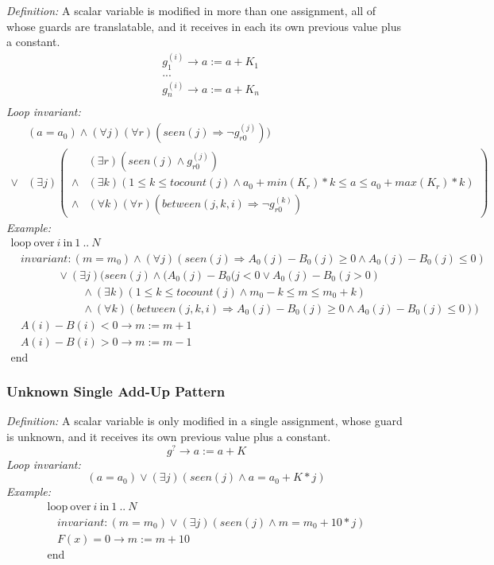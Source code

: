 \documentclass[a4paper,10pt]{article}
\newcommand{\idx}{\ensuremath{i}\xspace}
\newcommand{\at}[1]{{(#1)}}
\newcommand{\KWloop}{\ensuremath{\mathrm{loop}~}}
\newcommand{\KWend}{\ensuremath{\mathrm{end}~}}
\newcommand{\KWover}{\ensuremath{\mathrm{over}~}}
\newcommand{\KWin}{\ensuremath{~\mathrm{in}~}}
\newcommand{\impl}{\ensuremath{\Longrightarrow}}
\newcommand{\seen}[1]{\ensuremath{\mathit{seen}(#1)}\xspace}
\newcommand{\tocount}[1]{\ensuremath{\mathit{tocount}(#1)}\xspace}
\newcommand{\between}[3]{\ensuremath{\mathit{between}{(#1,#2,#3)}}\xspace}
\newcommand{\loopinvariant}{\noindent\textit{Loop invariant:}\xspace}
\newcommand{\patterndef}{\noindent\textit{Definition:}\xspace}
\newcommand{\patternexample}{\noindent\textit{Example:}\xspace}
\begin{document}
\patterndef A scalar variable is modified in more than one assignment, all of
whose guards are translatable, and it receives in each its own previous value
plus a constant.
%
\begin{eqnarray*}
&g_1^\at{\idx} \rightarrow a := a + K_1\\
&...\\
&g_n^\at{\idx} \rightarrow a := a + K_n\\
\end{eqnarray*}
%
\loopinvariant
%
\begin{eqnarray*}
&(a = a_0) \land (\forall j)(\forall r)( \seen{j} \impl \neg g_{r0}^\at{j})) \\
\lor 
& (\exists j)
\left(\begin{array}{cl}
&(\exists r)(\seen{j} \land g_{r0}^\at{j}) \\
\land& (\exists k)(1 \leq k \leq \tocount{j} \land a_0 + \mathit{min}(K_r) * k \leq a \leq a_0 + \mathit{max}(K_r) * k) \\
\land& (\forall k)(\forall r)(\between{j}{k}{\idx} \impl \neg g_{r0}^\at{k})
\end{array}\right)
\end{eqnarray*}
%
\patternexample
$$\begin{array}{l}
  \KWloop \KWover i \KWin 1~..~N \\
  ~~~~ \textit{invariant}: (m = m_0) \land (\forall j)(\seen{j} \impl A_0(j)-B_0(j) \geq 0 \land A_0(j)-B_0(j) \leq 0)\\
  ~~~~~~~~~~~~~~~~~~~ \lor (\exists j)(\seen{j} \land (A_0(j)-B_0(j < 0 \lor A_0(j)-B_0(j > 0) \\
  ~~~~~~~~~~~~~~~~~~~~~~~~~~~~~ \land (\exists k)(1 \leq k \leq \tocount{j} \land m_0-k \leq m \leq m_0 +k) \\
  ~~~~~~~~~~~~~~~~~~~~~~~~~~~~~ \land (\forall k)(\between{j}{k}{\idx} \impl A_0(j)-B_0(j) \geq 0 \land A_0(j)-B_0(j) \leq 0))\\
  ~~~~ A(i)-B(i) < 0 \rightarrow m := m+1\\
  ~~~~ A(i)-B(i) > 0 \rightarrow m := m-1\\
  \KWend
\end{array}$$

\subsubsection*{Unknown Single Add-Up Pattern}

\patterndef A scalar variable is only modified in a single assignment, whose
guard is unknown, and it receives its own previous value plus a constant.
%
$$g^? \rightarrow a := a + K$$
%
\loopinvariant
%
$$(a = a_0) \lor (\exists j)(\seen{j} \land a = a_0 + K * j)$$
%
\patternexample
$$\begin{array}{l}
  \KWloop \KWover i \KWin 1~..~N \\
  ~~~~ \textit{invariant}: (m = m_0) \lor (\exists j)(\seen{j} \land m = m_0+10*j)\\
  ~~~~ F(x)=0 \rightarrow m := m+10\\
  \KWend
\end{array}$$
\end{document}
